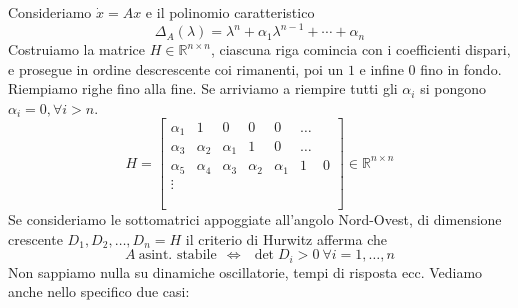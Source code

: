 \documentclass[10pt,a4paper]{book}
\begin{document}
Consideriamo $\dot{x} =Ax$ e il polinomio caratteristico
\begin{equation*}
	\Delta _A\left(\lambda \right) =\lambda ^n +\alpha _1 \lambda ^{n-1} +\cdots +\alpha _n
\end{equation*}
Costruiamo la matrice $H\in \mathbb{R}^{n\times n}$, ciascuna riga comincia con i coefficienti dispari, e prosegue in ordine descrescente coi rimanenti, poi un $1$ e infine $0$ fino in fondo. Riempiamo righe fino alla fine. Se arriviamo a riempire tutti gli $\alpha _i$ si pongono $\alpha _i =0,\forall i >n$.
\begin{equation*}
	H=\begin{bmatrix}
	\alpha _1 & 1 & 0 & 0 & 0 & \dotsc  & \\
	\alpha _3 & \alpha _2 & \alpha _1 & 1 & 0 & \dotsc  & \\
	\alpha _5 & \alpha _4 & \alpha _3 & \alpha _2 & \alpha _1 & 1 & 0\\
	\vdots  &  &  &  &  &  & \\
	&  &  &  &  &  & \\
	&  &  &  &  &  & \\
	&  &  &  &  &  & 
	\end{bmatrix} \in \mathbb{R}^{n\times n}
\end{equation*}
Se consideriamo le sottomatrici appoggiate all'angolo Nord-Ovest, di dimensione crescente $D_1 ,D_2 ,\dotsc ,D_n =H$ il criterio di Hurwitz afferma che
\begin{equation*}
	\boxed{A\ \text{asint. stabile} \ \ \Leftrightarrow \ \ \det D_i  >0\ \forall i=1,\dotsc ,n}
\end{equation*}
Non sappiamo nulla su dinamiche oscillatorie, tempi di risposta ecc. Vediamo anche nello specifico due casi:
\end{document}
